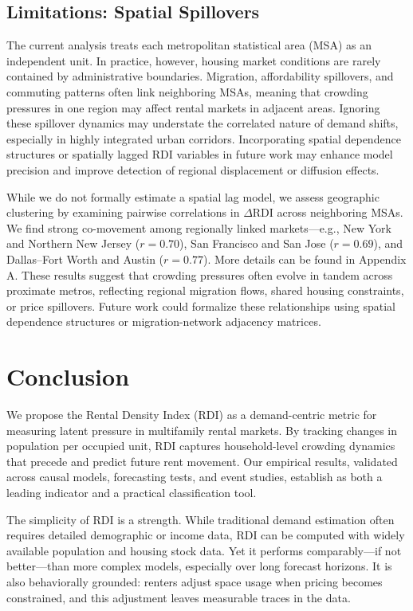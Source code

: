 \documentclass[APA,Times1COL]{WileyNJDv5} %
\begin{document}
\subsection{Limitations: Spatial Spillovers}

The current analysis treats each metropolitan statistical area (MSA) as an independent unit. In practice, however, housing market conditions are rarely contained by administrative boundaries. Migration, affordability spillovers, and commuting patterns often link neighboring MSAs, meaning that crowding pressures in one region may affect rental markets in adjacent areas. Ignoring these spillover dynamics may understate the correlated nature of demand shifts, especially in highly integrated urban corridors. Incorporating spatial dependence structures or spatially lagged RDI variables in future work may enhance model precision and improve detection of regional displacement or diffusion effects.

While we do not formally estimate a spatial lag model, we assess geographic clustering by examining pairwise correlations in $\Delta \text{RDI}$ across neighboring MSAs. We find strong co-movement among regionally linked markets—e.g., New York and Northern New Jersey ($r = 0.70$), San Francisco and San Jose ($r = 0.69$), and Dallas–Fort Worth and Austin ($r = 0.77$). More details can be found in Appendix A. These results suggest that crowding pressures often evolve in tandem across proximate metros, reflecting regional migration flows, shared housing constraints, or price spillovers. Future work could formalize these relationships using spatial dependence structures or migration-network adjacency matrices.

\section{Conclusion}

We propose the Rental Density Index (RDI) as a demand-centric metric for measuring latent pressure in multifamily rental markets. By tracking changes in population per occupied unit, RDI captures household-level crowding dynamics that precede and predict future rent movement. Our empirical results, validated across causal models, forecasting tests, and event studies, establish  as both a leading indicator and a practical classification tool.

The simplicity of RDI is a strength. While traditional demand estimation often requires detailed demographic or income data, RDI can be computed with widely available population and housing stock data. Yet it performs comparably—if not better—than more complex models, especially over long forecast horizons. It is also behaviorally grounded: renters adjust space usage when pricing becomes constrained, and this adjustment leaves measurable traces in the data.
\end{document}

